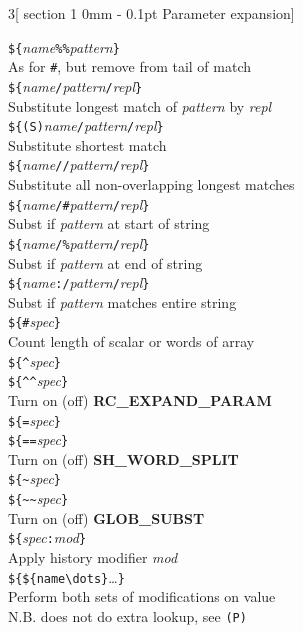 \documentclass{article}
\makeatletter
\renewcommand{\section}{\@startsection
  {section}%
  {1}%
  {0mm}%
  {-\baselineskip}%
  {0.1pt}%
  {\normalfont\normalsize\scshape}} %
\newcommand\B[1]{\textbf{#1}}
\newcommand\I[1]{\textsl{#1}}
\makeatother
\begin{document}
\begin{multicols}{3}[\section{Parameter expansion}]
\begin{tabbing}
\verb!${!\I{name}\verb!%%!\I{pattern}\verb!}! \\
                \> As for \verb!#!, but remove from tail of match \\
\verb!${!\I{name}\verb!/!\I{pattern}\verb!/!\I{repl}\verb!}! \\
                \> Substitute longest match of \I{pattern} by \I{repl} \\
\verb!${(S)!\I{name}\verb!/!\I{pattern}\verb!/!\I{repl}\verb!}! \\
                \> Substitute shortest match \\
\verb!${!\I{name}\verb!//!\I{pattern}\verb!/!\I{repl}\verb!}! \\
                \> Substitute all non-overlapping longest matches \\
\verb!${!\I{name}\verb!/#!\I{pattern}\verb!/!\I{repl}\verb!}! \\
                \> Subst if \I{pattern} at start of string \\
\verb!${!\I{name}\verb!/%!\I{pattern}\verb!/!\I{repl}\verb!}! \\
                \> Subst if \I{pattern} at end of string \\
\verb!${!\I{name}\verb!:/!\I{pattern}\verb!/!\I{repl}\verb!}! \\
                \> Subst if \I{pattern} matches entire string \\
\verb!${#!\I{spec}\verb!}! \\
                \> Count length of scalar or words of array \\
\verb!${^!\I{spec}\verb!}! \\
\verb!${^^!\I{spec}\verb!}! \\
                \> Turn on (off) \B{RC\_EXPAND\_PARAM} \\
\verb!${=!\I{spec}\verb!}! \\
\verb!${==!\I{spec}\verb!}! \\
                \> Turn on (off) \B{SH\_WORD\_SPLIT} \\
\verb!${~!\I{spec}\verb!}! \\
\verb!${~~!\I{spec}\verb!}! \\
                \> Turn on (off) \B{GLOB\_SUBST} \\
\verb!${!\I{spec}\verb!:!\I{mod}\verb!}! \\
                \> Apply history modifier \I{mod} \\
\verb!${${name\dots}!\dots\verb!}! \\
                \> Perform both sets of modifications on value \\
		\> N.B. does not do extra lookup, see \verb!(P)! \\
\end{tabbing}


\end{multicols}
\end{document}
